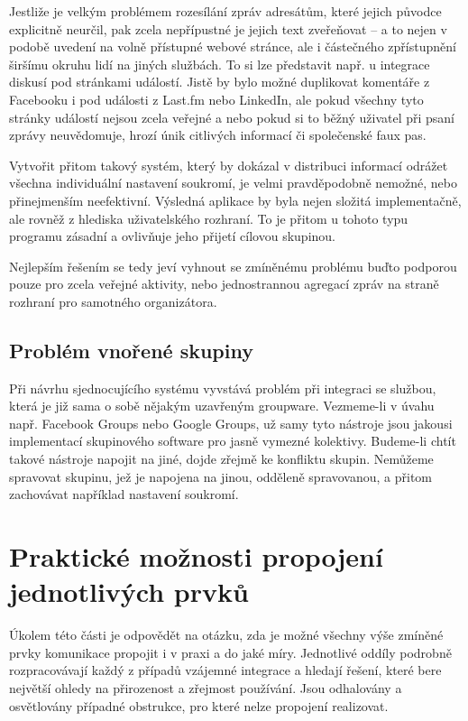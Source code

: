 \documentclass[12pt,oneside,final]{fithesis2}
\begin{document}
Jestliže je velkým problémem rozesílání zpráv adresátům, které jejich původce explicitně neurčil, pak zcela nepřípustné je jejich text zveřeňovat -- a to nejen v podobě uvedení na volně přístupné webové stránce, ale i částečného zpřístupnění širšímu okruhu lidí na jiných službách. To si lze představit např. u integrace diskusí pod stránkami událostí. Jistě by bylo možné duplikovat komentáře z Facebooku i pod události z Last.fm nebo LinkedIn, ale pokud všechny tyto stránky událostí nejsou zcela veřejné a nebo pokud si to běžný uživatel při psaní zprávy neuvědomuje, hrozí únik citlivých informací či společenské faux pas.

Vytvořit přitom takový systém, který by dokázal v distribuci informací odrážet všechna individuální nastavení soukromí, je velmi pravděpodobně nemožné, nebo přinejmenším neefektivní. Výsledná aplikace by byla nejen složitá implementačně, ale rovněž z hlediska uživatelského rozhraní. To je přitom u tohoto typu programu zásadní a ovlivňuje jeho přijetí cílovou skupinou.

Nejlepším řešením se tedy jeví vyhnout se zmíněnému problému buďto podporou pouze pro zcela veřejné aktivity, nebo jednostrannou agregací zpráv na straně rozhraní pro samotného organizátora.

\subsection{Problém vnořené skupiny}\label{innerGroup}
Při návrhu sjednocujícího systému vyvstává problém při integraci se službou, která je již sama o sobě nějakým uzavřeným groupware. Vezmeme-li v úvahu např. Facebook Groups nebo Google Groups, už samy tyto nástroje jsou jakousi implementací skupinového software pro jasně vymezné kolektivy. Budeme-li chtít takové nástroje napojit na jiné, dojde zřejmě ke konfliktu skupin. Nemůžeme spravovat skupinu, jež je napojena na jinou, odděleně spravovanou, a přitom zachovávat například nastavení soukromí.


\section{Praktické možnosti propojení jednotlivých prvků}\label{practicalOptions}
Úkolem této části je odpovědět na otázku, zda je možné všechny výše zmíněné prvky komunikace propojit i v praxi a do jaké míry. Jednotlivé oddíly podrobně rozpracovávají každý z případů vzájemné integrace a hledají řešení, které bere největší ohledy na přirozenost a zřejmost používání. Jsou odhalovány a osvětlovány případné obstrukce, pro které nelze propojení realizovat.
\end{document}
